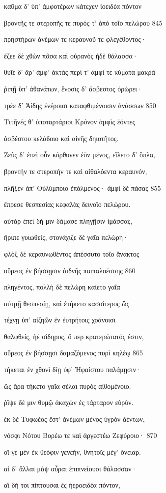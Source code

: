 καῦμα δ' ὑπ' ἀμφοτέρων κάτεχεν ἰοειδέα πόντον

βροντῆς τε στεροπῆς τε πυρός τ' ἀπὸ τοῖο πελώρου \num{845} 

πρηστήρων ἀνέμων τε κεραυνοῦ τε φλεγέθοντος· 

ἔζεε δὲ χθὼν πᾶσα καὶ οὐρανὸς ἠδὲ θάλασσα· 

θυῖε δ' ἄρ' ἀμφ' ἀκτὰς περί τ' ἀμφί τε κύματα μακρὰ

ῥιπῇ ὕπ' ἀθανάτων, ἔνοσις δ' ἄσβεστος ὀρώρει· 

τρέε δ' Ἀίδης ἐνέροισι καταφθιμένοισιν ἀνάσσων \num{850}

Τιτῆνές θ' ὑποταρτάριοι Κρόνον ἀμφὶς ἐόντες 

ἀσβέστου κελάδοιο καὶ αἰνῆς δηιοτῆτος. 

Ζεὺς δ' ἐπεὶ οὖν κόρθυνεν ἑὸν μένος, εἵλετο δ' ὅπλα,

βροντήν τε στεροπήν τε καὶ αἰθαλόεντα κεραυνόν,

πλῆξεν ἀπ' Οὐλύμποιο ἐπάλμενος· ἀμφὶ δὲ πάσας \num{855}

ἔπρεσε θεσπεσίας κεφαλὰς δεινοῖο πελώρου.

αὐτὰρ ἐπεὶ δή μιν δάμασε πληγῇσιν ἱμάσσας,

ἤριπε γυιωθείς, στονάχιζε δὲ γαῖα πελώρη· 

φλὸξ δὲ κεραυνωθέντος ἀπέσσυτο τοῖο ἄνακτος

οὔρεος ἐν βήσσῃσιν ἀιδνῆς παιπαλοέσσης \num{860}

πληγέντος, πολλὴ δὲ πελώρη καίετο γαῖα 

αὐτμῇ θεσπεσίῃ, καὶ ἐτήκετο κασσίτερος ὣς

τέχνῃ ὑπ' αἰζηῶν ἐν ἐυτρήτοις χοάνοισι

θαλφθείς, ἠὲ σίδηρος, ὅ περ κρατερώτατός ἐστιν, 

οὔρεος ἐν βήσσῃσι δαμαζόμενος πυρὶ κηλέῳ \num{865}

τήκεται ἐν χθονὶ δίῃ ὑφ' Ἡφαίστου παλάμῃσιν· 

ὣς ἄρα τήκετο γαῖα σέλαι πυρὸς αἰθομένοιο.

ῥῖψε δέ μιν θυμῷ ἀκαχὼν ἐς τάρταρον εὐρύν. 

ἐκ δὲ Τυφωέος ἔστ' ἀνέμων μένος ὑγρὸν ἀέντων,

νόσφι Νότου Βορέω τε καὶ ἀργεστέω Ζεφύροιο· \num{870}

οἵ γε μὲν ἐκ θεόφιν γενεήν, θνητοῖς μέγ' ὄνειαρ.

αἱ δ' ἄλλαι μὰψ αὖραι ἐπιπνείουσι θάλασσαν·

αἳ δή τοι πίπτουσαι ἐς ἠεροειδέα πόντον,

